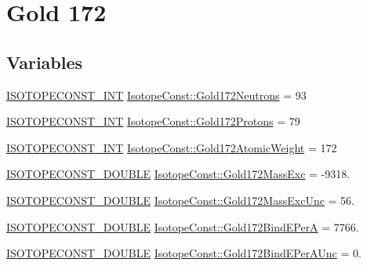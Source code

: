 \hypertarget{group___isotope_const-_gold-_au172}{}\section{Gold 172}
\label{group___isotope_const-_gold-_au172}
\subsection*{Variables}
\begin{DoxyCompactItemize}
\item 
\mbox{\hyperlink{group___isotope_const-_macros_ga5f18360b3e99483a35c32d789e62621c}{I\+S\+O\+T\+O\+P\+E\+C\+O\+N\+S\+T\+\_\+\+I\+NT}} \mbox{\hyperlink{group___isotope_const-_gold-_au172_gac527eae1d910968e58f0b042d4ce7fe8}{Isotope\+Const\+::\+Gold172\+Neutrons}} = 93
\item 
\mbox{\hyperlink{group___isotope_const-_macros_ga5f18360b3e99483a35c32d789e62621c}{I\+S\+O\+T\+O\+P\+E\+C\+O\+N\+S\+T\+\_\+\+I\+NT}} \mbox{\hyperlink{group___isotope_const-_gold-_au172_ga51f933e004ecaa09270588e4619c8022}{Isotope\+Const\+::\+Gold172\+Protons}} = 79
\item 
\mbox{\hyperlink{group___isotope_const-_macros_ga5f18360b3e99483a35c32d789e62621c}{I\+S\+O\+T\+O\+P\+E\+C\+O\+N\+S\+T\+\_\+\+I\+NT}} \mbox{\hyperlink{group___isotope_const-_gold-_au172_ga6e90d0dc6eae666bac9712c22f3c37f4}{Isotope\+Const\+::\+Gold172\+Atomic\+Weight}} = 172
\item 
\mbox{\hyperlink{group___isotope_const-_macros_ga8f45a7272ce02c0b4c65c44636ed719a}{I\+S\+O\+T\+O\+P\+E\+C\+O\+N\+S\+T\+\_\+\+D\+O\+U\+B\+LE}} \mbox{\hyperlink{group___isotope_const-_gold-_au172_ga6d119c3cfc234862848031f370a52991}{Isotope\+Const\+::\+Gold172\+Mass\+Exc}} = -\/9318.
\item 
\mbox{\hyperlink{group___isotope_const-_macros_ga8f45a7272ce02c0b4c65c44636ed719a}{I\+S\+O\+T\+O\+P\+E\+C\+O\+N\+S\+T\+\_\+\+D\+O\+U\+B\+LE}} \mbox{\hyperlink{group___isotope_const-_gold-_au172_ga2acedb0ce5e77b4be9cc7f4379f94156}{Isotope\+Const\+::\+Gold172\+Mass\+Exc\+Unc}} = 56.
\item 
\mbox{\hyperlink{group___isotope_const-_macros_ga8f45a7272ce02c0b4c65c44636ed719a}{I\+S\+O\+T\+O\+P\+E\+C\+O\+N\+S\+T\+\_\+\+D\+O\+U\+B\+LE}} \mbox{\hyperlink{group___isotope_const-_gold-_au172_ga27fc8e64fc3451f123d9d63055cbd76e}{Isotope\+Const\+::\+Gold172\+Bind\+E\+PerA}} = 7766.
\item 
\mbox{\hyperlink{group___isotope_const-_macros_ga8f45a7272ce02c0b4c65c44636ed719a}{I\+S\+O\+T\+O\+P\+E\+C\+O\+N\+S\+T\+\_\+\+D\+O\+U\+B\+LE}} \mbox{\hyperlink{group___isotope_const-_gold-_au172_ga9149dedc350f8acb57634f8dced96157}{Isotope\+Const\+::\+Gold172\+Bind\+E\+Per\+A\+Unc}} = 0.

\end{DoxyCompactItemize}

